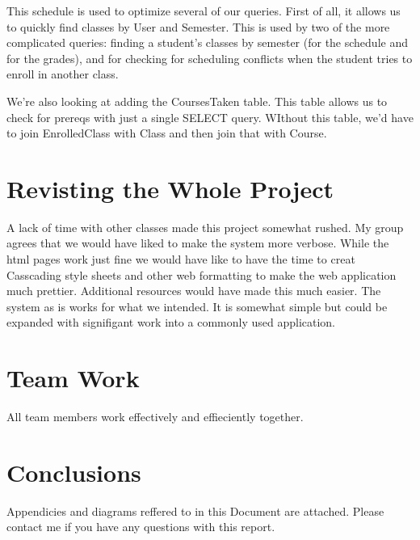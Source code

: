 \documentclass[11pt,oneside,a4paper]{article}
\begin{document}
This schedule is used to optimize several of our queries. First of all, it
allows us to quickly find classes by User and Semester. This is used by two of
the more complicated queries: finding a student's classes by semester (for the
schedule and for the grades), and for checking for scheduling conflicts when
the student tries to enroll in another class.

We're also looking at adding the CoursesTaken table. This table allows us to
check for prereqs with just a single SELECT query. WIthout this table, we'd
have to join EnrolledClass with Class and then join that with Course.
\section{Revisting the Whole Project}
A lack of time with other classes made this project somewhat rushed. My group agrees that we would have liked to make the system more verbose.  While the html pages work just fine we would have like to have the time to creat Casscading style sheets and other web formatting to make the web application much prettier.  Additional resources would have made this much easier.  The system as is works for what we intended.  It is somewhat simple but could be expanded with signifigant work into a commonly used application.
\section{Team Work}
All team members work effectively and effieciently together. 
\section{Conclusions}
Appendicies and diagrams reffered to in this Document are attached. Please contact me if you have any questions with this report.  
\end{document}

